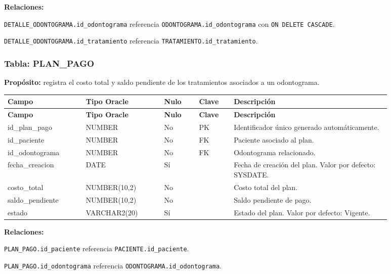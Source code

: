 \textbf{Relaciones:}\par
\texttt{DETALLE\_ODONTOGRAMA.id\_odontograma} referencia \texttt{ODONTOGRAMA.id\_odontograma} con \texttt{ON DELETE CASCADE}.\par
\texttt{DETALLE\_ODONTOGRAMA.id\_tratamiento} referencia \texttt{TRATAMIENTO.id\_tratamiento}.\par



\subsubsection{Tabla: PLAN\_PAGO}

\textbf{Propósito:} registra el costo total y saldo pendiente de los tratamientos asociados a un odontograma.\par

\begin{longtable}{p{0.18\linewidth}p{0.18\linewidth}p{0.08\linewidth}p{0.08\linewidth}p{0.36\linewidth}}
\toprule
\textbf{Campo} & \textbf{Tipo Oracle} & \textbf{Nulo} & \textbf{Clave} & \textbf{Descripción} \\
\midrule
\endfirsthead
\toprule
\textbf{Campo} & \textbf{Tipo Oracle} & \textbf{Nulo} & \textbf{Clave} & \textbf{Descripción} \\
\midrule
\endhead
id\_plan\_pago & NUMBER & No & PK & Identificador único generado automáticamente. \\
id\_paciente & NUMBER & No & FK & Paciente asociado al plan. \\
id\_odontograma & NUMBER & No & FK & Odontograma relacionado. \\
fecha\_creacion & DATE & Sí &  & Fecha de creación del plan. Valor por defecto: SYSDATE. \\
costo\_total & NUMBER(10,2) & No &  & Costo total del plan. \\
saldo\_pendiente & NUMBER(10,2) & No &  & Saldo pendiente de pago. \\
estado & VARCHAR2(20) & Sí &  & Estado del plan. Valor por defecto: Vigente. \\
\bottomrule
\end{longtable}

\textbf{Relaciones:}\par
\texttt{PLAN\_PAGO.id\_paciente} referencia \texttt{PACIENTE.id\_paciente}.\par
\texttt{PLAN\_PAGO.id\_odontograma} referencia \texttt{ODONTOGRAMA.id\_odontograma}.\par

